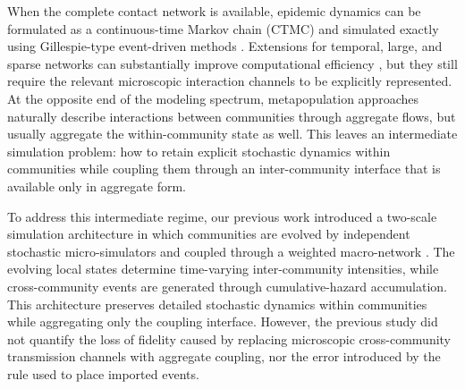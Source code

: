 \documentclass[a4paper,fleqn]{cas-sc}
\begin{document}
When the complete contact network is available, epidemic dynamics can be formulated as a continuous-time Markov chain (CTMC) and simulated exactly using Gillespie-type event-driven methods \cite{gillespie1977exact}. Extensions for temporal, large, and sparse networks can substantially improve computational efficiency \cite{vestergaard2015,kuryliak2025simulating}, but they still require the relevant microscopic interaction channels to be explicitly represented. At the opposite end of the modeling spectrum, metapopulation approaches naturally describe interactions between communities through aggregate flows, but usually aggregate the within-community state as well. This leaves an intermediate simulation problem: how to retain explicit stochastic dynamics within communities while coupling them through an inter-community interface that is available only in aggregate form.


To address this intermediate regime, our previous work introduced a two-scale simulation architecture in which communities are evolved by independent stochastic micro-simulators and coupled through a weighted macro-network \cite{kuryliak2025twoscale}. The evolving local states determine time-varying inter-community intensities, while cross-community events are generated through cumulative-hazard accumulation. This architecture preserves detailed stochastic dynamics within communities while aggregating only the coupling interface. However, the previous study did not quantify the loss of fidelity caused by replacing microscopic cross-community transmission channels with aggregate coupling, nor the error introduced by the rule used to place imported events.
\end{document}
